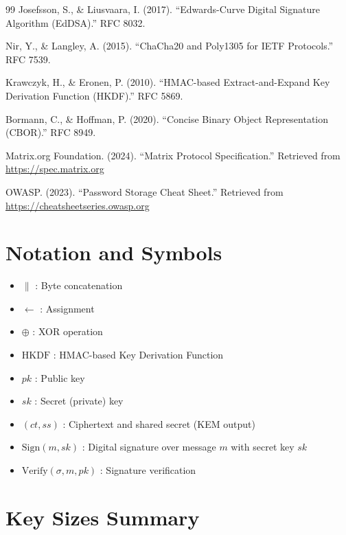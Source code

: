 \documentclass[11pt,a4paper,oneside]{article}
\begin{document}
\begin{enumerate}
\begin{thebibliography}{99}
Josefsson, S., \& Liusvaara, I. (2017).
``Edwards-Curve Digital Signature Algorithm (EdDSA).''
RFC 8032.

Nir, Y., \& Langley, A. (2015).
``ChaCha20 and Poly1305 for IETF Protocols.''
RFC 7539.

Krawczyk, H., \& Eronen, P. (2010).
``HMAC-based Extract-and-Expand Key Derivation Function (HKDF).''
RFC 5869.

Bormann, C., \& Hoffman, P. (2020).
``Concise Binary Object Representation (CBOR).''
RFC 8949.

Matrix.org Foundation. (2024).
``Matrix Protocol Specification.''
Retrieved from \url{https://spec.matrix.org}

OWASP. (2023).
``Password Storage Cheat Sheet.''
Retrieved from \url{https://cheatsheetseries.owasp.org}

\end{thebibliography}

\newpage
\appendix

\section{Notation and Symbols}

\begin{itemize}
\item $\|$ : Byte concatenation
\item $\leftarrow$ : Assignment
\item $\oplus$ : XOR operation
\item $\text{HKDF}$ : HMAC-based Key Derivation Function
\item $pk$ : Public key
\item $sk$ : Secret (private) key
\item $(ct, ss)$ : Ciphertext and shared secret (KEM output)
\item $\text{Sign}(m, sk)$ : Digital signature over message $m$ with secret key $sk$
\item $\text{Verify}(\sigma, m, pk)$ : Signature verification
\end{itemize}

\section{Key Sizes Summary}


\end{enumerate}
\end{document}
